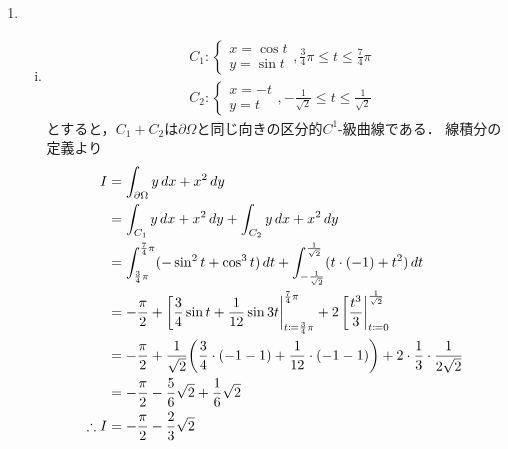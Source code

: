 



\pagestyle{fancy}



\maketitle

\begin{enumerate}[(1)]
    \item \begin{enumerate}[(i)]
        \item \begin{align}
            &C_1:
            \begin{cases}
                x=\cos t\\
                y=\sin t
            \end{cases}
            ,\frac{3}{4}\pi\le t\le \frac{7}{4}\pi\\
            &C_2:
            \begin{cases}
                x=- t\\
                y= t
            \end{cases}
            ,-\frac{1}{\sqrt{2}}\le t\le \frac{1}{\sqrt{2}}
        \end{align}
        とすると，$C_1+C_2$は$\partial \Omega$と同じ向きの区分的$C^1$-級曲線である．
        線積分の定義より
        \begin{align}
            I
            &=\int_{\partial \Omega} y \dd{x}+x^2\dd{y}\\
            &=\int_{C_1} y \dd{x}+x^2\dd{y}+\int_{C_2} y \dd{x}+x^2\dd{y}\\
            &=\int^{\frac{7}{4}\pi}_{\frac{3}{4}\pi} (-\sin^2t+\cos^3t)\dd{t}+\int^\frac{1}{\sqrt{2}}_{-\frac{1}{\sqrt{2}}} (t\cdot(-1)+t^2)\dd{t}\\
            &=-\frac{\pi}{2}+\eval[\frac{3}{4}\sin t+\frac{1}{12}\sin 3t|^{\frac{7}{4}\pi}_{t\coloneqq \frac{3}{4}\pi} +2\eval[\frac{t^3}{3}|^\frac{1}{\sqrt{2}}_{t\coloneqq 0}\\
            &=-\frac{\pi}{2}+\frac{1}{\sqrt{2}}\qty(\frac{3}{4}\cdot(-1-1)+\frac{1}{12}\cdot(-1-1))+2\cdot\frac{1}{3}\cdot\frac{1}{2\sqrt{2}}\\
            &=-\frac{\pi}{2}-\frac{5}{6}\sqrt{2}+\frac{1}{6}\sqrt{2}\\
            \therefore
            I
            &=-\frac{\pi}{2}-\frac{2}{3}\sqrt{2}

\end{align}
\end{enumerate}
\end{enumerate}
